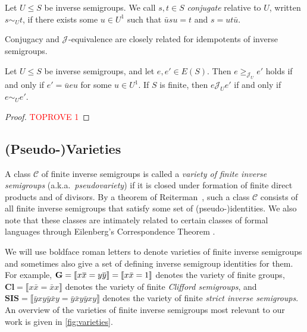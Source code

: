 \documentclass[anonymous,letter,UKenglish,cleveref,autoref,thm-restate]{lipics-v2021}
\renewcommand{\geq}{\geqslant}
\renewcommand{\leq}{\leqslant}
\newcommand{\vG}{\ensuremath{\mathbf{G}}}
\newcommand{\vCl}{\ensuremath{\mathbf{Cl}}}
\newcommand{\vSI}{\ensuremath{\mathbf{SIS}}}
\newcommand{\vId}[1]{\ensuremath{\llbracket #1 \rrbracket}}
\newcommand*{\gJ}[1][]{\mathrel{\mathcal{J}_{#1}}}
\newcommand*{\gJge}[1][]{\geq_{\mathcal{J}_{#1}}}
\newcommand\nindent{.5pt}
\newcommand\noverline[1]{\kern\nindent\overline{\kern-\nindent#1\kern-\nindent}\kern\nindent}
\newcommand{\ov}[1]{\noverline{#1}}
\newcommand{\cC}{\mathcal{C}}
\theoremstyle{plain}
\theoremstyle{plain}
\begin{document}
\begin{definition}\label{def:conjugacy}
	Let $U \leq S$ be inverse semigroups.
  We call $s,t \in S$ \emph{conjugate} relative to $U$, written $s \sim_U t$, if there exists some $u \in U^1$ such that $\bar u s u = t$ and $s = u t \bar u$.
\end{definition}

Conjugacy and $\gJ$-equivalence are closely related for idempotents of inverse semigroups.

\begin{lemma}\label{lem:idem_conj_is_green_j}
	Let $U \leq S$ be inverse semigroups, and let $e, e' \in E(S)$.
	Then $e \gJge[U] e'$ holds if and only if $e' = \bar u e u$ for some $u \in U^1$.
	If $S$ is finite, then $e \gJ[U] e'$ if and only if $e \sim_U e'$.
\end{lemma}
\begin{proof}\textcolor{red}{TOPROVE 1}\end{proof}


\subsection{(Pseudo-)Varieties}

A class $\cC$ of finite inverse semigroups is called a \emph{variety of finite inverse semigroups} (a.k.a.\ \emph{pseudovariety}) if it is closed under formation of finite direct products and of divisors.
By a theorem of Reiterman~\cite{rei82:short}, such a class $\cC$ consists of all finite inverse semigroups that satisfy some set of (pseudo-)identities.
We also note that these classes are intimately related to certain classes of formal languages through Eilenberg's Correspondence Theorem \cite{eil76}.

We will use boldface roman letters to denote varieties of finite inverse semigroups and sometimes also give a set of defining inverse semigroup identities for them.
For example, $\vG = \vId{x\ov x = y \ov y} =  \vId{x \bar x = 1}$ denotes the variety of finite groups, $\vCl = \vId{x \bar x = \bar x x}$ denotes the variety of finite \emph{Clifford semigroups}, and $\vSI = \vId{\bar y x y \bar y \bar x y = \bar y \bar x y \bar y x y}$ denotes the variety of finite \emph{strict inverse semigroups}.
An overview of the varieties of finite inverse semigroups most relevant to our work is given in \cref{fig:varieties}.
\end{document}
